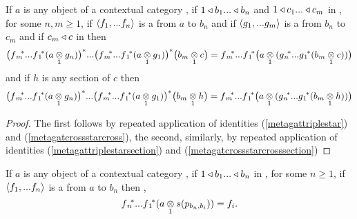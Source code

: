 \begin{lemma} 
If $a$ is any object of a contextual category \catcw, if $1 \base b_1 ... \base b_n$ and $1 \base c_1 ... \base c_m$ in \catc, for some $n,m \ge 1$, 
if $\tuple{\fn}$ is a  from $a$ to $b_n$ and
if $\tuple{\gm}$ is a  from $b_n$ to $c_m$ and if  $c_m \base c$ in \catcw then
\begin{equation}
\label{cascadedpullbackscohereonobjects}
\big(\fmvectorstar (\crossx{a}{g_n}{1})\big)^* ... \big(\fmvectorstar (\crossx{a}{g_1}{1})\big) ^* \big(\crossx{b_m}{c}{1}\big) 
= \fmvectorstar \big(  \crossx{a}{(\gnvectorstar(\crossx{b_m}{c}{1}))}{1} \big)                                    
\end{equation}
and if  $h$ is any section of $c$ then 
\begin{equation}
\label{cascadedpullbackscohereonsections}
\big(\fmvectorstar (\crossx{a}{g_n}{1})\big)^* ... \big(\fmvectorstar (\crossx{a}{g_1}{1})\big) ^* \big(\crossx{b_m}{h}{1}\big) 
= \fmvectorstar \big(  \crossx{a}{(\gnvectorstar(\crossx{b_m}{h}{1}))}{1} \big)                                    
\end{equation}
\end{lemma}
\begin{proof}
The first follows by repeated application of identities (\ref{metagattriplestar}) and (\ref{metagatcrossstarcross}), 
the second, similarly, by repeated application of identities (\ref{metagattriplestarsection}) and (\ref{metagatcrossstarcrosssection})
\end{proof}
\begin{lemma}
If $a$ is any object of a contextual category \catcw, if $1 \base b_1 ... \base b_n$ in \catc, for some $n \ge 1$, 
if $\tuple{\fn}$ is a  from $a$ to $b_n$ then \foreachi,
\begin{equation}
\fnvectorstar(\crossx{a}{s(p_{b_n,b_i})}{1})=f_i.                                    
\end{equation}
\end{lemma}